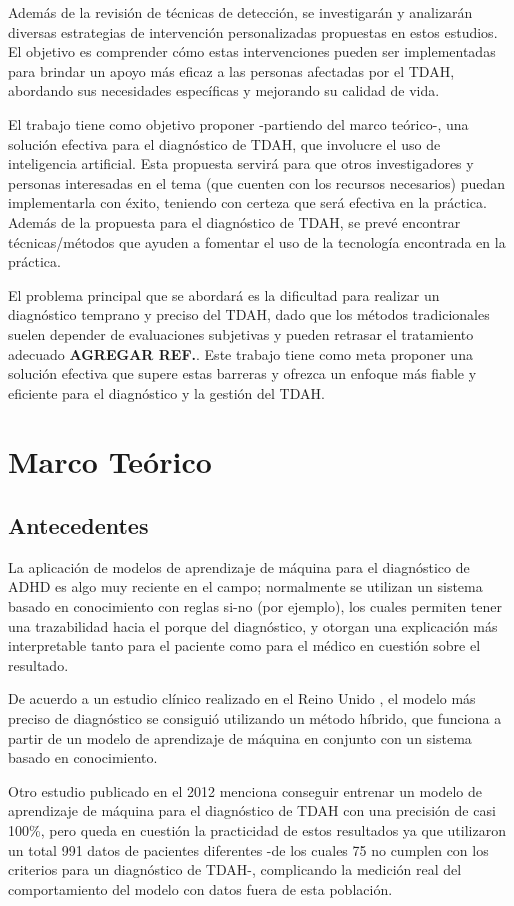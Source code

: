 \documentclass[10pt,journal,compsoc]{IEEEtran}
\begin{document}
Además de la revisión de técnicas de detección, se investigarán y analizarán diversas estrategias de intervención personalizadas propuestas en estos estudios. El objetivo es comprender cómo estas intervenciones pueden ser implementadas para brindar un apoyo más eficaz a las personas afectadas por el TDAH, abordando sus necesidades específicas y mejorando su calidad de vida.

El trabajo tiene como objetivo proponer -partiendo del marco teórico-, una solución efectiva para el diagnóstico de TDAH, que involucre el uso de inteligencia artificial. Esta propuesta servirá para que otros investigadores y personas interesadas en el tema (que cuenten con los recursos necesarios) puedan implementarla con éxito, teniendo con certeza que será efectiva en la práctica. Además de la propuesta para el diagnóstico de TDAH, se prevé encontrar técnicas/métodos que ayuden a fomentar el uso de la tecnología encontrada en la práctica.

El problema principal que se abordará es la dificultad para realizar un diagnóstico temprano y preciso del TDAH, dado que los métodos tradicionales suelen depender de evaluaciones subjetivas y pueden retrasar el tratamiento adecuado \textbf{AGREGAR REF.}. Este trabajo tiene como meta proponer una solución efectiva que supere estas barreras y ofrezca un enfoque más fiable y eficiente para el diagnóstico y la gestión del TDAH.

\section{Marco Teórico}
\subsection{Antecedentes}
La aplicación de modelos de aprendizaje de máquina para el diagnóstico de ADHD es algo muy reciente en el campo; normalmente se utilizan un sistema basado en conocimiento con reglas si-no (por ejemplo), los cuales permiten tener una trazabilidad hacia el porque del diagnóstico, y otorgan una explicación más interpretable tanto para el paciente como para el médico en cuestión sobre el resultado.

De acuerdo a un estudio clínico realizado en el Reino Unido \cite{chen-2023}, el modelo más preciso de diagnóstico se consiguió utilizando un método híbrido, que funciona a partir de un modelo de aprendizaje de máquina en conjunto con un sistema basado en conocimiento.

Otro estudio publicado en el 2012 \cite{wall-2012} menciona conseguir entrenar un modelo de aprendizaje de máquina para el diagnóstico de TDAH con una precisión de casi 100\%, pero queda en cuestión la practicidad de estos resultados ya que utilizaron un total 991 datos de pacientes diferentes -de los cuales 75 no cumplen con los criterios para un diagnóstico de TDAH-, complicando la medición real del comportamiento del modelo con datos fuera de esta población.
\end{document}
